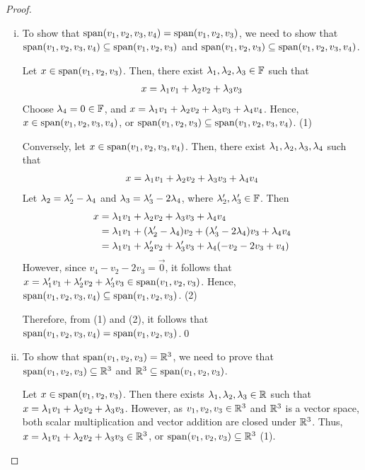 \renewcommand{\qedsymbol}{$ $}
\begin{proof}
    \begin{enumerate}[(i)]
        \renewcommand{\qedsymbol}{$\blacksquare$}
        \item To show that $\textnormal{span}(v_1,v_2,v_3,v_4)=\textnormal{span}(v_1,v_2,v_3)$, we need to show that $\textnormal{span}(v_1,v_2,v_3,v_4)\subseteq\textnormal{span}(v_1,v_2,v_3)$ and $\textnormal{span}(v_1,v_2,v_3)\subseteq\textnormal{span}(v_1,v_2,v_3,v_4)$.
        
        Let $x\in\textnormal{span}(v_1,v_2,v_3)$. Then, there exist $\lambda_1,\lambda_2,\lambda_3\in\mathbb F$ such that
        \[
            \begin{aligned}
                x=\lambda_1v_1+\lambda_2v_2+\lambda_3v_3
            \end{aligned}    
        \]
        Choose $\lambda_4=0\in\mathbb F$, and $x=\lambda_1v_1+\lambda_2v_2+\lambda_3v_3+\lambda_4v_4$. Hence, $x\in\textnormal{span}(v_1,v_2,v_3,v_4)$, or $\textnormal{span}(v_1,v_2,v_3)\subseteq\textnormal{span}(v_1,v_2,v_3,v_4)$. (1)
        
        Conversely, let $x\in\textnormal{span}(v_1,v_2,v_3,v_4)$. Then, there exist $\lambda_1,\lambda_2,\lambda_3,\lambda_4$ such that
        \[
            \begin{aligned}
                x=\lambda_1v_1+\lambda_2v_2+\lambda_3v_3+\lambda_4v_4
            \end{aligned}
        \]  
        Let $\lambda_2=\lambda_2'-\lambda_4$ and $\lambda_3=\lambda_3'-2\lambda_4$, where $\lambda_2',\lambda_3'\in\mathbb F$. Then
        \[
            \begin{aligned}
                x &= \lambda_1v_1+\lambda_2v_2+\lambda_3v_3+\lambda_4v_4\\
                  &= \lambda_1v_1+(\lambda_2'-\lambda_4)v_2+(\lambda_3'-2\lambda_4)v_3+\lambda_4v_4\\
                  &= \lambda_1v_1+\lambda_2'v_2+\lambda_3'v_3+\lambda_4(-v_2-2v_3+v_4)
            \end{aligned}  
        \]
        However, since $v_4-v_2-2v_3=\vec{0}$, it follows that $x=\lambda_1'v_1+\lambda_2'v_2+\lambda_3'v_3\in\textnormal{span}(v_1,v_2,v_3)$. Hence, $\textnormal{span}(v_1,v_2,v_3,v_4)\subseteq\textnormal{span}(v_1,v_2,v_3)$. (2)

        Therefore, from (1) and (2), it follows that $\textnormal{span}(v_1,v_2,v_3,v_4)=\textnormal{span}(v_1,v_2,v_3)$.\qed
        \item To show that $\textnormal{span}(v_1,v_2,v_3)=\mathbb R^3$, we need to prove that $\textnormal{span}(v_1,v_2,v_3)\subseteq\mathbb R^3$ and $\mathbb R^3\subseteq\textnormal{span}(v_1,v_2,v_3)$.
        
        Let $x\in\textnormal{span}(v_1,v_2,v_3)$. Then there exists $\lambda_1,\lambda_2,\lambda_3\in\mathbb R$ such that $x=\lambda_1v_1+\lambda_2v_2+\lambda_3v_3$. However, as $v_1,v_2,v_3\in\mathbb R^3$ and $\mathbb R^3$ is a vector space, both scalar multiplication and vector addition are closed under $\mathbb R^3$. Thus, $x=\lambda_1v_1+\lambda_2v_2+\lambda_3v_3\in\mathbb R^3$, or $\textnormal{span}(v_1,v_2,v_3)\subseteq\mathbb R^3$ (1).


\end{enumerate}
\end{proof}
